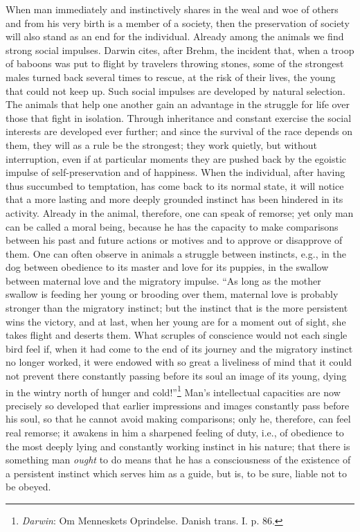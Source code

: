 \documentclass[12pt,a4paper,openany]{book}
\newcommand{\opage}[1]{\marginnote{\footnotesize\textit{[#1]}}}
\begin{document}
When man immediately and instinctively shares in the weal and woe of others
and from his very birth is a member of a society, then the preservation of
society will also stand as an end for the individual. Already among the
animals we find strong social impulses. Darwin cites, after Brehm, the
incident that, when a troop of baboons was put to flight by travelers throwing
stones, some of the strongest males turned back several times to rescue, at
the risk of their lives, the young that could not keep up. Such social
impulses are developed by natural selection. The animals that help one another
gain an advantage in the struggle for life over those that fight in isolation.
Through inheritance and constant exercise the social interests are developed
ever further; and since the survival of the race depends on them, they will as
a rule be the strongest; they work quietly, but without interruption, even if
at particular moments they are pushed back by the egoistic impulse of
self-preservation and of happiness. When the individual, after having thus
\opage{34}succumbed to temptation, has come back to its normal state, it will
notice that a more lasting and more deeply grounded instinct has been hindered
in its activity. Already in the animal, therefore, one can speak of remorse;
yet only man can be called a moral being, because he has the capacity to make
comparisons between his past and future actions or motives and to approve or
disapprove of them. One can often observe in animals a struggle between
instincts, e.g., in the dog between obedience to its master and love for its
puppies, in the swallow between maternal love and the migratory impulse. ``As
long as the mother swallow is feeding her young or brooding over them,
maternal love is probably stronger than the migratory instinct; but the
instinct that is the more persistent wins the victory, and at last, when her
young are for a moment out of sight, she takes flight and deserts them. What
scruples of conscience would not each single bird feel if, when it had come to
the end of its journey and the migratory instinct no longer worked, it were
endowed with so great a liveliness of mind that it could not prevent there
constantly passing before its soul an image of its young, dying in the wintry
north of hunger and cold!''\footnote[1]{\emph{Darwin}: Om Menneskets
Oprindelse. Danish trans. I. p. 86.} Man's intellectual capacities are now
precisely so developed that earlier impressions and images constantly pass
before his soul, so that he cannot avoid making \opage{35}comparisons; only
he, therefore, can feel real remorse; it awakens in him a sharpened feeling of
duty, i.e., of obedience to the most deeply lying and constantly working
instinct in his nature; that there is something man \emph{ought} to do means
that he has a consciousness of the existence of a persistent instinct which
serves him as a guide, but is, to be sure, liable not to be obeyed.
\end{document}

